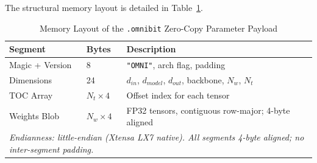 \documentclass[conference]{IEEEtran}
\begin{document}
The structural memory layout is detailed in Table~\ref{tab:omnibit_layout}.

\begin{table}[h]
\centering
\caption{Memory Layout of the \texttt{.omnibit} Zero-Copy Parameter Payload}
\label{tab:omnibit_layout}
\begin{tabular}{|l|l|p{4cm}|}
\hline
\textbf{Segment} & \textbf{Bytes} & \textbf{Description} \\ \hline
Magic + Version  & 8  & \texttt{"OMNI"}, arch flag, padding \\ \hline
Dimensions       & 24 & $d_{in}$, $d_{model}$, $d_{out}$, backbone, $N_w$, $N_t$ \\ \hline
TOC Array        & $N_t \!\times\! 4$ & Offset index for each tensor \\ \hline
Weights Blob     & $N_w \!\times\! 4$ & FP32 tensors, contiguous row-major;
                                         4-byte aligned \\ \hline
\multicolumn{3}{|l|}{\small\textit{Endianness: little-endian (Xtensa LX7 native).
  All segments 4-byte aligned; no inter-segment padding.}} \\ \hline
\end{tabular}
\end{table}
\end{document}
